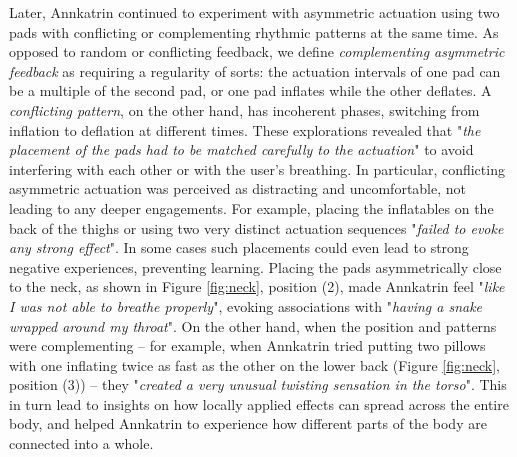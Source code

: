 Later, Annkatrin continued to experiment with asymmetric actuation using two pads with conflicting or complementing rhythmic patterns at the same time. As opposed to random or conflicting feedback, we define \textit{complementing asymmetric feedback} as requiring a regularity of sorts: the actuation intervals of one pad can be a multiple of the second pad, or one pad inflates while the other deflates. A \textit{conflicting pattern}, on the other hand, has incoherent phases, switching from inflation to deflation at different times. These explorations revealed that "\textit{the placement of the pads had to be matched carefully to the actuation}" to avoid interfering with each other or with the user's breathing. In particular, conflicting asymmetric actuation was perceived as distracting and uncomfortable, not leading to any deeper engagements. For example, placing the inflatables on the back of the thighs or using two very distinct actuation sequences "\textit{failed to evoke any strong effect}". In some cases such placements could even lead to strong negative experiences, preventing learning. Placing the pads asymmetrically close to the neck, as shown in Figure \ref{fig:neck}, position (2), made Annkatrin feel "\textit{like I was not able to breathe properly}", evoking associations with "\textit{having a snake wrapped around my throat}". On the other hand, when the position and patterns were complementing -- for example, when Annkatrin tried putting two pillows with one inflating twice as fast as the other on the lower back (Figure \ref{fig:neck}, position (3)) -- they "\textit{created a very unusual twisting sensation in the torso}". This in turn lead to insights on how locally applied effects can spread across the entire body, and helped Annkatrin to experience how different parts of the body are connected into a whole. 

